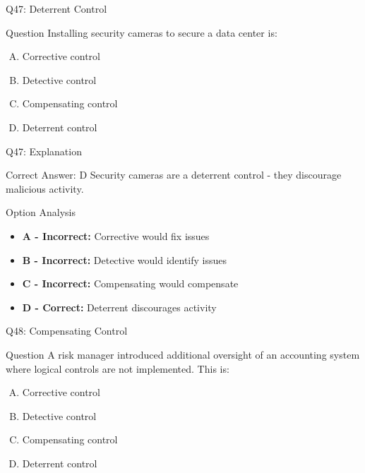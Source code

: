 \documentclass{beamer}
\begin{document}
	\begin{frame}{Q47: Deterrent Control}
		\begin{block}{Question}
			Installing security cameras to secure a data center is:
		\end{block}
		\begin{enumerate}[(A)]
			\item Corrective control
			\item Detective control
			\item Compensating control
			\item Deterrent control
		\end{enumerate}
	\end{frame}
	
	\begin{frame}{Q47: Explanation}
		\begin{block}{Correct Answer: D}
			Security cameras are a deterrent control - they discourage malicious activity.
		\end{block}
		\begin{block}{Option Analysis}
			\begin{itemize}
				\item \textbf{A - Incorrect:} Corrective would fix issues
				\item \textbf{B - Incorrect:} Detective would identify issues
				\item \textbf{C - Incorrect:} Compensating would compensate
				\item \textbf{D - Correct:} Deterrent discourages activity
			\end{itemize}
		\end{block}
	\end{frame}
	
	\begin{frame}{Q48: Compensating Control}
		\begin{block}{Question}
			A risk manager introduced additional oversight of an accounting system where logical controls are not implemented. This is:
		\end{block}
		\begin{enumerate}[(A)]
			\item Corrective control
			\item Detective control
			\item Compensating control
			\item Deterrent control
		\end{enumerate}
	\end{frame}
	
\end{document}

